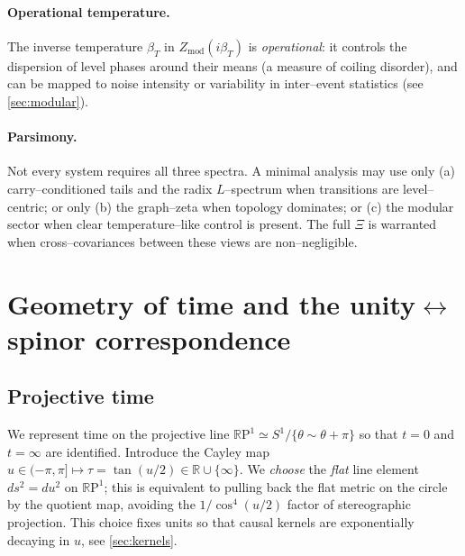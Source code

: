 \documentclass[11pt]{article}
\newcommand{\R}{\mathbb{R}}
\newcommand{\RP}{\mathbb{R}\mathrm{P}^1}
\begin{document}
\paragraph{Operational temperature.}
The inverse temperature $\beta_T$ in $Z_{\mathrm{mod}}(i\beta_T)$ is \emph{operational}: it controls the dispersion of level phases around their means (a measure of coiling disorder), and can be mapped to noise intensity or variability in inter--event statistics (see \cref{sec:modular}).

\paragraph{Parsimony.}
Not every system requires all three spectra. A minimal analysis may use only (a) carry--conditioned tails and the radix $L$--spectrum when transitions are level--centric; or only (b) the graph--zeta when topology dominates; or (c) the modular sector when clear temperature--like control is present. The full $\Xi$ is warranted when cross--covariances between these views are non--negligible.

\section{Geometry of time and the unity$\leftrightarrow$spinor correspondence}
\label{sec:geom}
\subsection{Projective time}
We represent time on the projective line $\RP\simeq S^1/\{\theta\sim \theta+\pi\}$ so that $t=0$ and $t=\infty$ are identified.
Introduce the Cayley map $u\in(-\pi,\pi]\mapsto \tau=\tan(u/2)\in\R\cup\{\infty\}$.
We \emph{choose} the \emph{flat} line element $ds^2=du^2$ on $\RP$; this is equivalent to pulling back the flat metric on the circle by the quotient map, avoiding the $1/\cos^4(u/2)$ factor of stereographic projection. This choice fixes units so that causal kernels are exponentially decaying in $u$, see \cref{sec:kernels}.
\end{document}
